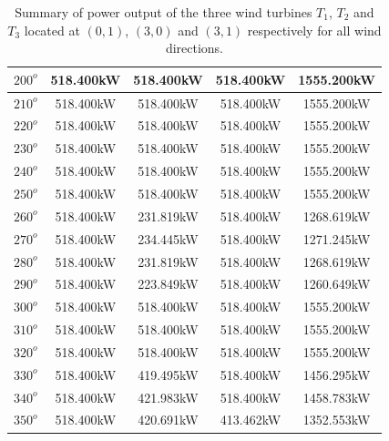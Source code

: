 \begin{table}[H]
\begin{tabular}{|c|c|c|c|c|}
	     \hline
	     $200^{o}$ & 518.400kW & 518.400kW & 518.400kW & 1555.200kW \\
	     \hline
	     $210^{o}$ & 518.400kW & 518.400kW & 518.400kW & 1555.200kW \\
	     \hline
	     $220^{o}$ & 518.400kW & 518.400kW & 518.400kW & 1555.200kW \\
	     \hline
	     $230^{o}$ & 518.400kW & 518.400kW & 518.400kW & 1555.200kW \\
	     \hline
	     $240^{o}$ & 518.400kW & 518.400kW & 518.400kW & 1555.200kW \\
	     \hline
	     $250^{o}$ & 518.400kW & 518.400kW & 518.400kW & 1555.200kW \\
	     \hline
	     $260^{o}$ & 518.400kW & 231.819kW & 518.400kW & 1268.619kW \\
	     \hline
	     $270^{o}$ & 518.400kW & 234.445kW & 518.400kW & 1271.245kW \\
	     \hline
	     $280^{o}$ & 518.400kW & 231.819kW & 518.400kW & 1268.619kW \\
	     \hline
	     $290^{o}$ & 518.400kW & 223.849kW & 518.400kW & 1260.649kW \\
	     \hline
	     $300^{o}$ & 518.400kW & 518.400kW & 518.400kW & 1555.200kW \\
	     \hline
	     $310^{o}$ & 518.400kW & 518.400kW & 518.400kW & 1555.200kW \\
	     \hline
	     $320^{o}$ & 518.400kW & 518.400kW & 518.400kW & 1555.200kW \\
	     \hline
	     $330^{o}$ & 518.400kW & 419.495kW & 518.400kW & 1456.295kW \\
	     \hline
	     $340^{o}$ & 518.400kW & 421.983kW & 518.400kW & 1458.783kW \\
	     \hline
	     $350^{o}$ & 518.400kW & 420.691kW & 413.462kW & 1352.553kW \\
	     \hline
	    \end{tabular}
	    \caption{Summary of power output of the three wind turbines $T_1$, $T_2$ and $T_3$ located at $(0,1)$, $(3,0)$ and $(3,1)$ respectively for all wind directions.}
	    \label{summaryRandom1-3b}
	\end{table}
	\doublespacing
	   
